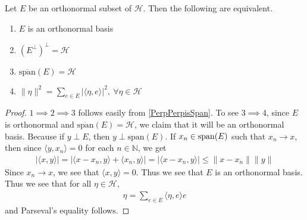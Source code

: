 \begin{corollary}
  Let $E$ be an orthonormal subset of $\mathcal{H}$. Then the
  following are equivalent.
  \begin{enumerate}[label=(\arabic*)]
    \item $E$ is an orthonormal basis
    \item $(E^\perp)^\perp = \mathcal{H}$
    \item $\overline{\textrm{span}}(E) = \mathcal{H}$
    \item $\|\eta\|^2 = \sum_{e \in E} |\langle \eta ,  e \rangle
      |^2, \ \forall \eta \in \mathcal{H}$
  \end{enumerate}
\end{corollary}
\begin{proof}
  $1 \implies 2 \implies 3$ follows easily from
  \autoref{PerpPerpisSpan}. To see $3 \implies 4$, since $E$ is
  orthonormal and $\overline{\textrm{span}}(E) = \mathcal{H}$,
  we claim that it will be an orthonormal basis. Because if $y \perp E$, then $y
  \perp \textrm{span}(E)$. If $x_n \in \textrm{\textrm{span}}(E)$
  such that $x_n \to x$, then since $\langle y , x_n \rangle = 0$ for
  each $n \in \mathbb{N}$, we get
  \begin{align*}
    |\langle x , y \rangle|  = |\langle x - x_n , y \rangle + \langle
    x_n , y \rangle| = |\langle x - x_n , y \rangle| \le \|x-x_n\|\|y\|
  \end{align*}
  Since $x_n \to x$, we see that $\langle x , y \rangle = 0$. Thus we
  see that $E$ is an orthonormal basis. Thus we see that for all
  $\eta \in \mathcal{H}$,
  \begin{align*}
    \eta = \sum_{e \in E} \langle \eta ,  e \rangle e
  \end{align*}
  and Parseval's equality follows.

\end{proof}

